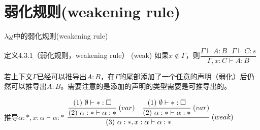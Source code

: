 \documentclass[UTF8,aspectratio=169,mathserif]{beamer}
\begin{document}
	\section{弱化规则(weakening rule)}
		\begin{frame}{$\lambda{\uline{\omega}}$中的弱化规则(weakening rule)}
			\begin{exampleblock}{定义4.3.1（弱化规则，weakening rule）}
				(weak) 如果$x\not\in\Gamma$，则$\dfrac{\Gamma\vdash A:B\ \ \ \Gamma\vdash C:s}{\Gamma,x:C\vdash A:B}$
			\end{exampleblock}
		
			若上下文$\Gamma$已经可以推导出$A:B$，在$\Gamma$的尾部添加了一个任意的声明（弱化）后仍然可以推导出$A:B$。需要注意的是添加的声明的类型需要是可推导出的。
		
			\begin{block}{推导$\alpha:*,x:\alpha\vdash\alpha:*$}
				$\cfrac{\cfrac{(1)\ \emptyset\vdash*:\square}{(2)\ \alpha:*\vdash\alpha:*}\ (var)\ \ \ \cfrac{(1)\ \emptyset\vdash*:\square}{(2)\ \alpha:*\vdash\alpha:*}\ (var)}{(3)\ \alpha:*,x:\alpha\vdash\alpha:*}\ (weak)$
			\end{block}
		
		\end{frame}
\end{document}
